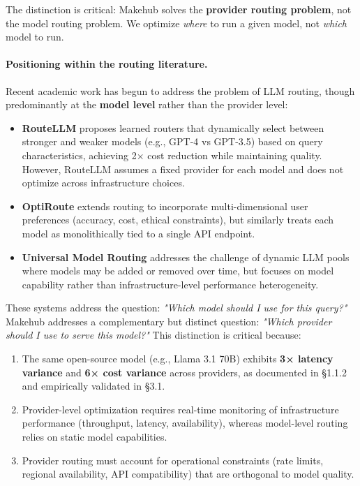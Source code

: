 \documentclass[english]{article}
\begin{document}
The distinction is critical: Makehub solves the \textbf{provider routing problem}, not the model routing problem. We optimize \emph{where} to run a given model, not \emph{which} model to run.

\paragraph{Positioning within the routing literature.}

Recent academic work has begun to address the problem of LLM routing, though predominantly at the \textbf{model level} rather than the provider level:

\begin{itemize}
    \item \textbf{RouteLLM} \parencite{ong2024routellm} proposes learned routers that dynamically select between stronger and weaker models (e.g., GPT-4 vs GPT-3.5) based on query characteristics, achieving 2× cost reduction while maintaining quality. However, RouteLLM assumes a fixed provider for each model and does not optimize across infrastructure choices.

    \item \textbf{OptiRoute} \parencite{kumar2025dynamic} extends routing to incorporate multi-dimensional user preferences (accuracy, cost, ethical constraints), but similarly treats each model as monolithically tied to a single API endpoint.

    \item \textbf{Universal Model Routing} \parencite{zhao2025universal} addresses the challenge of dynamic LLM pools where models may be added or removed over time, but focuses on model capability rather than infrastructure-level performance heterogeneity.
\end{itemize}

These systems address the question: \emph{"Which model should I use for this query?"} Makehub addresses a complementary but distinct question: \emph{"Which provider should I use to serve this model?"} This distinction is critical because:

\begin{enumerate}
    \item The same open-source model (e.g., Llama 3.1 70B) exhibits \textbf{3× latency variance} and \textbf{6× cost variance} across providers, as documented in §1.1.2 and empirically validated in §3.1.
    \item Provider-level optimization requires real-time monitoring of infrastructure performance (throughput, latency, availability), whereas model-level routing relies on static model capabilities.
    \item Provider routing must account for operational constraints (rate limits, regional availability, API compatibility) that are orthogonal to model quality.
\end{enumerate}
\end{document}
